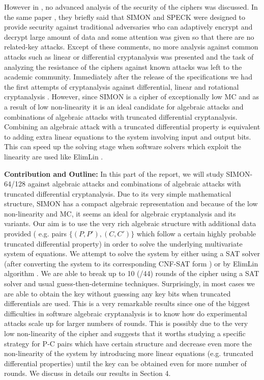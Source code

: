 However in \cite{NSAciphers}, no advanced analysis of the security of the ciphers was discussed. In the same paper \cite{NSAciphers}, they briefly said that SIMON and SPECK were designed to provide security against traditional adversaries who can adaptively encrypt and decrypt large amount of data and some attention was given so that there are no related-key attacks. Except of these comments, no more analysis against common attacks such as linear or differential cryptanalysis was presented and the task of analyzing the resistance of the ciphers against known attacks was left to the academic community. Immediately after the release of the specifications we had the first attempts of cryptanalysis against differential, linear and rotational cryptanalysis \cite{simon1,simon2}. However, since SIMON is a cipher of exceptionally low MC and as a result of low non-linearity it is an ideal candidate for algebraic attacks and combinations of algebraic attacks with truncated differential cryptanalysis. Combining an algebraic attack with a truncated differential property is equivalent to adding extra linear equations to the system involving input and output bits. This can speed up the solving stage when software solvers which exploit the linearity are used like ElimLin \cite{ElimLinR}.

\textbf{Contribution and Outline:} In this part of the report, we will study SIMON-64/128
against algebraic attacks and combinations of algebraic attacks with
truncated differential cryptanalysis. Due to its very simple mathematical structure,
SIMON has a compact algebraic representation and because of the low non-linearity and
MC, it seems an ideal for algebraic
cryptanalysis and its variants. Our aim is to use the very rich algebraic structure
with additional data provided ( e.g. pairs $\{(P,P'),(C,C')\}$ which
follow a certain highly probable truncated differential property) in order to solve
the underlying multivariate system of equations. We attempt to solve the system
by either using a SAT solver (after converting the system to its corresponding
CNF-SAT form \cite{BardCourtoiJeffersonConv}) or by ElimLin algorithm \cite{FourMNL,OptimiPaper,OptimiPaper2}.
We are able to break up to 10 (/44) rounds of the cipher using
a SAT solver and usual guess-then-determine techniques.
Surprisingly, in most cases we are
able to obtain the key without guessing any key bits
when truncated differentials are used.
This is a very remarkable results
since one of the biggest difficulties in software algebraic cryptanalysis is
to know how do experimental attacks scale up for larger numbers of rounds.
This is possibly due
to the very low non-linearity of the cipher and suggests that it worths studying
a specific strategy for P-C pairs which have certain structure and decrease
even more the non-linearity of the system by introducing
more linear equations (e.g. truncated differential properties)
until the key can be obtained even
for more number of rounds. We
discuss in details our results in Section 4.

